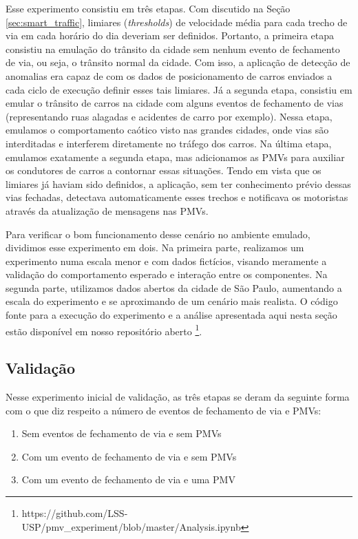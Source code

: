 Esse experimento consistiu em três etapas.
Com discutido na Seção \ref{sec:smart_traffic}, limiares (\textit{thresholds}) de velocidade média para cada trecho de via em cada horário do dia deveriam ser definidos.
Portanto, a primeira etapa consistiu na emulação do trânsito da cidade sem nenhum evento de fechamento de via, ou seja, o trânsito normal da cidade.
Com isso, a aplicação de detecção de anomalias era capaz de com os dados de posicionamento de carros enviados a cada ciclo de execução definir esses tais limiares.
Já a segunda etapa, consistiu em emular o trânsito de carros na cidade com alguns eventos de fechamento de vias (representando ruas alagadas e acidentes de carro por exemplo).
Nessa etapa, emulamos o comportamento caótico visto nas grandes cidades, onde vias são interditadas e interferem diretamente no tráfego dos carros.
Na última etapa, emulamos exatamente a segunda etapa, mas adicionamos as PMVs para auxiliar os condutores de carros a contornar essas situações.
Tendo em vista que os limiares já haviam sido definidos, a aplicação, sem ter conhecimento prévio dessas vias fechadas, detectava automaticamente esses trechos e notificava os motoristas através da
atualização de mensagens nas PMVs.

Para verificar o bom funcionamento desse cenário no ambiente emulado, dividimos esse experimento em dois.
Na primeira parte, realizamos um experimento numa escala menor e com dados fictícios, visando meramente a validação do comportamento esperado e interação entre os componentes.
Na segunda parte, utilizamos dados abertos da cidade de São Paulo, aumentando a escala do experimento e se aproximando de um cenário mais realista.
O código fonte para a execução do experimento e a análise apresentada aqui nesta seção estão disponível em nosso repositório aberto
\footnote{https://github.com/LSS-USP/pmv\_experiment/blob/master/Analysis.ipynb}.

\subsection{Validação}

Nesse experimento inicial de validação, as três etapas se deram da seguinte forma com o que diz respeito a número de eventos de fechamento de via e PMVs:

\begin{enumerate}
    \item Sem eventos de fechamento de via e sem PMVs

    \item Com um evento de fechamento de via e sem PMVs

    \item Com um evento de fechamento de via e uma PMV
\end{enumerate}

